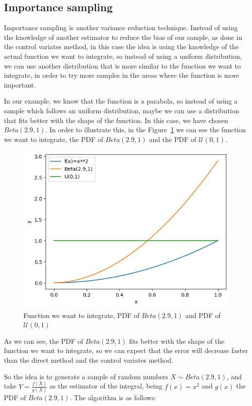 \documentclass{report}
\begin{document}
\subsection{Importance sampling}
\label{sec:importance_sampling}

Importance sampling is another variance reduction technique. Instead of using the knowledge of another estimator to reduce the bias of our sample, as done in the control variates method, in this case the idea is using the knowledge of the actual function we want to integrate, so instead of using a uniform distribution, we can use another distribution that is more similar to the function we want to integrate, in order to try more samples in the areas where the function is more important. 

In our example, we know that the function is a parabola, so instead of using a sample which follows an uniform distribution, maybe we can use a distribution that fits better with the shape of the function. In this case, we have chosen \(Beta(2.9,1)\). In order to illustrate this, in the Figure~\ref{fig:beta42_f} we can see the function we want to integrate, the PDF of \(Beta(2.9,1)\) and the PDF of \(\mathcal{U}(0,1)\).

\begin{figure}[H]
	\centering
	\includegraphics[width=0.5\linewidth]{./Figures/VarianceReduction/beta.png}
	\caption{Function we want to integrate, PDF of \(Beta(2.9,1)\) and PDF of \(\mathcal{U}(0,1)\)}
	\label{fig:beta42_f}
\end{figure}

As we can see, the PDF of \(Beta(2.9,1)\) fits better with the shape of the function we want to integrate, so we can expect that the error will decrease faster than the direct method and the control variates method. 

So the idea is to generate a sample of random numbers \(X \sim Beta(2.9,1)\), and take \(Y = \frac{f(X)}{g(X)}\) as the estimator of the integral, being \(f(x) = x^2\) and \(g(x)\) the PDF of \(Beta(2.9,1)\). The algorithm is as follows:
\end{document}
